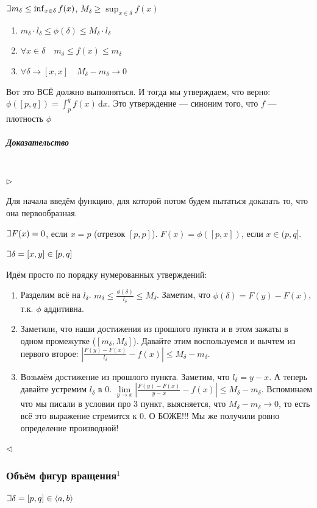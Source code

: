 \documentclass{article}
\def\letus{%
\mathord{\setbox0=\hbox{$\exists$}%
         \hbox{\kern 0.125\wd0%
               \vbox to \ht0{%
                  \hrule width 0.75\wd0%
                  \vfill%
                  \hrule width 0.75\wd0}%
               \vrule height \ht0%
               \kern 0.125\wd0}%
       }%
        }
\def\D{\,\mathrm{d}}
\let\vanillasubparagraph\subparagraph
\renewcommand{\subparagraph}[1]{\vanillasubparagraph{#1}\mbox{}\\}
\begin{document}
$\letus m_\delta \le \inf_{x\in \delta}f(x)$, $M_\delta \ge \sup_{x\in \delta}f(x)$

\begin{enumerate}
    \item $m_\delta \cdot l_\delta \le \phi(\delta) \le M_\delta \cdot l_\delta$
    \item $\forall x \in \delta \quad m_\delta \le f(x) \le m_\delta$
    \item $\forall \delta \rightarrow [x, x] \quad M_\delta - m_\delta \rightarrow 0$
\end{enumerate}

Вот это ВСЁ должно выполняться. И тогда мы утверждаем, что верно: $\phi([p, q]) = \int_p^q f(x)\D x$. Это утверждение --- синоним того, что $f$ --- плотность $\phi$

\subparagraph{Доказательство}
$\rhd$

Для начала введём функцию, для которой потом будем пытаться доказать то, что она первообразная.

$\letus F(x) = 0$, если $x = p$ (отрезок $[p, p]$). $F(x) = \phi([p, x])$, если $x \in (p, q]$.

$\letus \delta = [x, y] \in [p, q]$

Идём просто по порядку нумерованных утверждений:
\begin{enumerate}
    \item Разделим всё на $l_\delta$. $m_\delta \le \frac{\phi(\delta)}{l_\delta} \le M_\delta$. Заметим, что $\phi(\delta) = F(y) - F(x)$, т.к. $\phi$ аддитивна.
    
    \item Заметили, что наши достижения из прошлого пункта и в этом зажаты в одном промежутке ($[m_\delta, M_\delta]$). Давайте этим воспользуемся и вычтем из первого второе: $|\frac{F(y) - F(x)}{l_\delta} - f(x)| \le M_\delta - m_\delta$.
    
    \item Возьмём достижение из прошлого пункта. Заметим, что $l_\delta = y - x$. А теперь давайте устремим $l_\delta$ в $0$. $\lim\limits_{y\rightarrow x} |\frac{F(y) - F(x)}{y - x} - f(x)| \le M_\delta - m_\delta$. Вспоминаем что мы писали в условии про 3 пункт, выясняется, что $M_\delta - m_\delta \rightarrow 0$, то есть всё это выражение стремится к 0. О БОЖЕ!!! Мы же получили ровно определение производной!
\end{enumerate}
$\lhd$


\subsubsection{Объём фигур вращения\texorpdfstring{$^1$}{}}
$\letus \delta = [p, q] \in \langle a, b \rangle$
\end{document}
